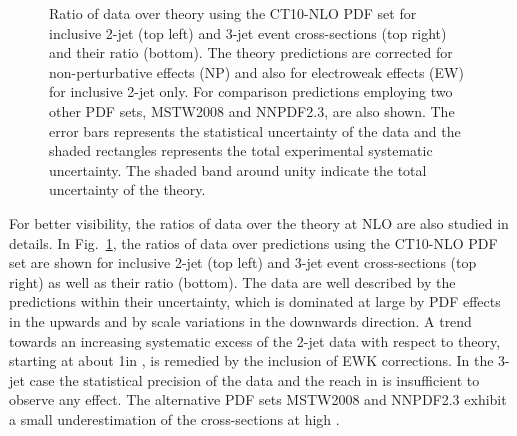 \begin{figure}[!ht]
\begin{center}
 \caption{Ratio of data over theory using the CT10-NLO PDF set for inclusive 2-jet (top left) and 3-jet event cross-sections (top right) and their ratio \ratio (bottom). The theory predictions are corrected for non-perturbative effects (NP) and also for electroweak effects (EW) for inclusive 2-jet only. For comparison predictions employing two other PDF sets, MSTW2008 and NNPDF2.3, are also shown. The error bars represents the statistical uncertainty of the data and the shaded rectangles represents the total experimental systematic uncertainty. The shaded band around unity indicate the total uncertainty of the theory.}
 \label{fig:data_NLOPdfs}
 \end{center}
\end{figure}

For better visibility, the ratios of data over the theory at NLO are also studied in details. In Fig.~\ref{fig:data_NLOPdfs}, the ratios of data over \NLOJETPP predictions using the CT10-NLO PDF set are shown for inclusive 2-jet (top left) and 3-jet event cross-sections (top right) as well as their ratio \ratio (bottom). The data are well described by the predictions within their uncertainty, which is dominated at large \httwo by PDF effects in the upwards and by scale variations in the downwards direction. A trend towards an increasing systematic excess of the 2-jet data with respect to theory, starting at about 1\TeV in \httwo, is remedied by the inclusion of EWK corrections. In the 3-jet case the statistical precision of the data and the reach in \httwo is insufficient to observe any effect. The alternative PDF sets MSTW2008 and NNPDF2.3 exhibit a small underestimation of the cross-sections at high \httwo.

